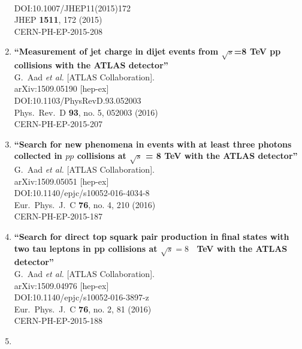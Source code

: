 \documentclass{article}
\begin{document}
\begin{enumerate}
  \\{}DOI:10.1007/JHEP11(2015)172
  \\{}JHEP {\bf 1511}, 172 (2015)
  \\{}CERN-PH-EP-2015-208
\item%
{\bf ``Measurement of jet charge in dijet events from $\sqrt{s}$=8  TeV pp collisions with the ATLAS detector''}
  \\{}G.~Aad {\it et al.} [ATLAS Collaboration].
  \\{}arXiv:1509.05190 [hep-ex]
  \\{}DOI:10.1103/PhysRevD.93.052003
  \\{}Phys.\ Rev.\ D {\bf 93}, no. 5, 052003 (2016)
  \\{}CERN-PH-EP-2015-207
\item%
{\bf ``Search for new phenomena in events with at least three photons collected in $pp$ collisions at $\sqrt{s}$ = 8 TeV with the ATLAS detector''}
  \\{}G.~Aad {\it et al.} [ATLAS Collaboration].
  \\{}arXiv:1509.05051 [hep-ex]
  \\{}DOI:10.1140/epjc/s10052-016-4034-8
  \\{}Eur.\ Phys.\ J.\ C {\bf 76}, no. 4, 210 (2016)
  \\{}CERN-PH-EP-2015-187
\item%
{\bf ``Search for direct top squark pair production in final states with two tau leptons in pp collisions at $\sqrt{s}=8$  TeV with the ATLAS detector''}
  \\{}G.~Aad {\it et al.} [ATLAS Collaboration].
  \\{}arXiv:1509.04976 [hep-ex]
  \\{}DOI:10.1140/epjc/s10052-016-3897-z
  \\{}Eur.\ Phys.\ J.\ C {\bf 76}, no. 2, 81 (2016)
  \\{}CERN-PH-EP-2015-188
\item%

\end{enumerate}
\end{document}

